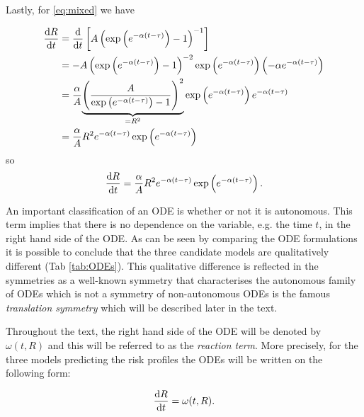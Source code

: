 Lastly, for \eqref{eq:mixed} we have


\begin{align*}
  \dv{R}{t}&=\dv{}{t}\left[A\left(\exp\left(e^{-\alpha(t-\tau)}\right)-1\right)^{-1}\right]\\
           &=-A\left(\exp\left(e^{-\alpha(t-\tau)}\right)-1\right)^{-2}\exp\left(e^{-\alpha(t-\tau)}\right)\left(-\alpha e^{-\alpha(t-\tau)}\right)\\            &=\dfrac{\alpha}{A}\underset{=R^2}{\underbrace{\left(\dfrac{A}{\exp\left(e^{-\alpha(t-\tau)}\right)-1}\right)^2}}\exp\left(e^{-\alpha(t-\tau)}\right)e^{-\alpha(t-\tau)}\\
  &=\dfrac{\alpha}{A}R^2e^{-\alpha(t-\tau)}\exp\left(e^{-\alpha(t-\tau)}\right)
\end{align*}
so
$$\dv{R}{t}=\dfrac{\alpha}{A}R^2e^{-\alpha(t-\tau)}\exp\left(e^{-\alpha(t-\tau)}\right).$$

An important classification of an ODE is whether or not it is autonomous. This term implies that there is no dependence on the variable, e.g. the time $t$, in the right hand side of the ODE. As can be seen by comparing the ODE formulations it is possible to conclude that the three candidate models are qualitatively different (Tab \ref{tab:ODEs}). This qualitative difference is reflected in the symmetries as a well-known symmetry that characterises the autonomous family of ODEs which is not a symmetry of non-autonomous ODEs is the famous \textit{translation symmetry} which will be described later in the text.

Throughout the text, the right hand side of the ODE will be denoted by $\omega(t,R)$ and this will be referred to as the \textit{reaction term}. More precisely, for the three models predicting the risk profiles the ODEs will be written on the following form:

\begin{equation}
\dv{R}{t}=\omega(t,R).
\label{eq:general_ODE}
\end{equation}


